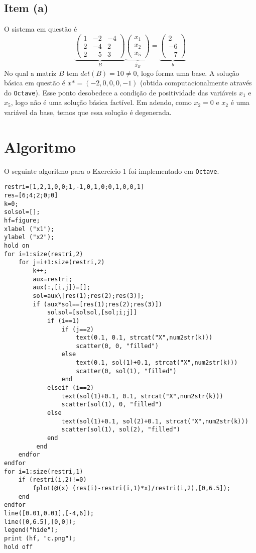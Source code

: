 \documentclass[a4paper, 12pt]{article}
\begin{document}
\subsection{Item (a)}
O sistema em questão é
\[
\underbrace{
\begin{pmatrix}
1&-2&-4\\
2&-4&2\\
2&-5&3
\end{pmatrix}}_B
\underbrace{
\begin{pmatrix}
x_1\\
x_2\\
x_5
\end{pmatrix}}_{\hat{x}_B}
=
\underbrace{
\begin{pmatrix}
2\\
-6\\
-7
\end{pmatrix}}_{b}
\]
No qual a matriz $B$ tem $det(B)=10\neq0$, logo forma uma base. A solução básica em questão é $x*=(-2,0,0,0,-1)$ (obtida computacionalmente através do \verb+Octave+). Esse ponto desobedece a condição de positividade das variáveis $x_1$ e $x_5$, logo não é uma solução básica factível. Em adendo, como $x_2=0$ e $x_2$ é uma variável da base, temos que essa solução é degenerada.
\section{Algoritmo}
O seguinte algoritmo para o Exercício 1 foi implementado em \verb+Octave+.
\begin{verbatim}
restri=[1,2,1,0,0;1,-1,0,1,0;0,1,0,0,1]
res=[6;4;2;0;0]
k=0;
solsol=[];
hf=figure;
xlabel ("x1");
ylabel ("x2");
hold on
for i=1:size(restri,2)
    for j=i+1:size(restri,2)
        k++;
        aux=restri;
        aux(:,[i,j])=[];
        sol=aux\[res(1);res(2);res(3)];
        if (aux*sol==[res(1);res(2);res(3)])
            solsol=[solsol,[sol;i;j]]
            if (i==1)
                if (j==2)
                    text(0.1, 0.1, strcat("X",num2str(k)))
                    scatter(0, 0, "filled")
                else
                    text(0.1, sol(1)+0.1, strcat("X",num2str(k)))
                    scatter(0, sol(1), "filled")
                end
            elseif (i==2)
                text(sol(1)+0.1, 0.1, strcat("X",num2str(k)))
                scatter(sol(1), 0, "filled")
            else
                text(sol(1)+0.1, sol(2)+0.1, strcat("X",num2str(k)))
                scatter(sol(1), sol(2), "filled")
            end
         end
    endfor
endfor
for i=1:size(restri,1)
    if (restri(i,2)!=0)
        fplot(@(x) (res(i)-restri(i,1)*x)/restri(i,2),[0,6.5]);
    end
endfor
line([0.01,0.01],[-4,6]);
line([0,6.5],[0,0]);
legend("hide");
print (hf, "c.png");
hold off
\end{verbatim}
\end{document}

